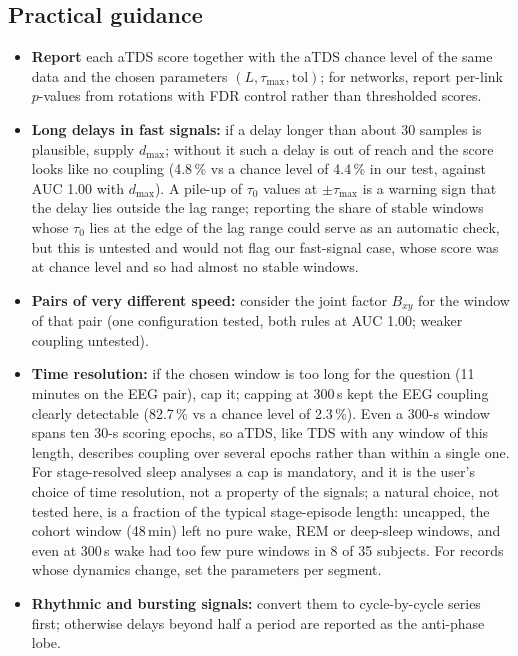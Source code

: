 \documentclass[11pt,a4paper]{article}
\begin{document}
\subsection*{Practical guidance}
\label{sec:guidance}
\begin{itemize}
\item \textbf{Report} each aTDS score together with the aTDS chance level of the same data and the chosen parameters $(L, \tau_{\max}, \mathrm{tol})$; for networks, report per-link $p$-values from rotations with FDR control rather than thresholded scores.
\item \textbf{Long delays in fast signals:} if a delay longer than about 30 samples is plausible, supply $d_{\max}$; without it such a delay is out of reach and the score looks like no coupling (4.8\,\% vs a chance level of 4.4\,\% in our test, against AUC 1.00 with $d_{\max}$). A pile-up of $\tau_0$ values at $\pm\tau_{\max}$ is a warning sign that the delay lies outside the lag range; reporting the share of stable windows whose $\tau_0$ lies at the edge of the lag range could serve as an automatic check, but this is untested and would not flag our fast-signal case, whose score was at chance level and so had almost no stable windows.
\item \textbf{Pairs of very different speed:} consider the joint factor $B_{xy}$ for the window of that pair (one configuration tested, both rules at AUC 1.00; weaker coupling untested).
\item \textbf{Time resolution:} if the chosen window is too long for the question (11 minutes on the EEG pair), cap it; capping at 300\,s kept the EEG coupling clearly detectable (82.7\,\% vs a chance level of 2.3\,\%). Even a 300-s window spans ten 30-s scoring epochs, so aTDS, like TDS with any window of this length, describes coupling over several epochs rather than within a single one. For stage-resolved sleep analyses a cap is mandatory, and it is the user's choice of time resolution, not a property of the signals; a natural choice, not tested here, is a fraction of the typical stage-episode length: uncapped, the cohort window (48\,min) left no pure wake, REM or deep-sleep windows, and even at 300\,s wake had too few pure windows in 8 of 35 subjects. For records whose dynamics change, set the parameters per segment.
\item \textbf{Rhythmic and bursting signals:} convert them to cycle-by-cycle series first; otherwise delays beyond half a period are reported as the anti-phase lobe.
\end{itemize}
\end{document}
